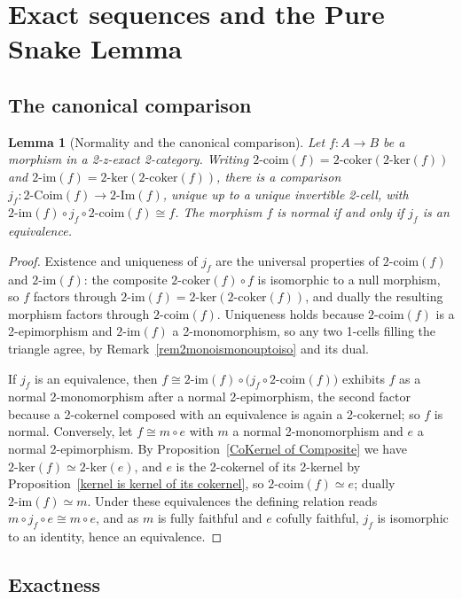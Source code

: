 \documentclass[reqno,a4paper]{amsart}
\numberwithin{equation}{section}
\theoremstyle{plain}
\newtheorem{lemma}[subsection]{Lemma}
\theoremstyle{definition}
\def\nameit#1{\textrm{#1}~}
\def\prox{\nameit{Proposition}}
\def\remx{\nameit{Remark}}
\def\dfn#1{{\itshape #1}}
\newcommand{\comp}{\circ}
\newcommand{\iso}{\cong}
\renewcommand{\1}{\onecat{1}}
\newcommand{\twoker}{\ensuremath{2\text{-}\mathrm{ker}}}
\newcommand{\twocoker}{\ensuremath{2\text{-}\mathrm{coker}}}
\newcommand{\TwoImg}{\ensuremath{2\text{-}\mathrm{Im}}}
\newcommand{\twoimg}{\ensuremath{2\text{-}\mathrm{im}}}
\newcommand{\TwoCoim}{\ensuremath{2\text{-}\mathrm{Coim}}}
\newcommand{\twocoim}{\ensuremath{2\text{-}\mathrm{coim}}}
\begin{document}
\section{Exact sequences and the Pure Snake Lemma}\label{S:Exact}

\subsection{The canonical comparison}\label{SS:Comparison}

\begin{lemma}[Normality and the canonical comparison]\label{Normal Iff Comparison Iso}
	Let \(f\colon A\to B\) be a morphism in a 2-z-exact 2-category. Writing \(\twocoim(f)=\twocoker(\twoker(f))\) and \(\twoimg(f)=\twoker(\twocoker(f))\), there is a \dfn{comparison} \(j_f\colon\TwoCoim(f)\to\TwoImg(f)\), unique up to a unique invertible 2-cell, with \(\twoimg(f)\comp j_f\comp\twocoim(f)\iso f\). The morphism \(f\) is normal if and only if \(j_f\) is an equivalence.
\end{lemma}
\begin{proof}
	Existence and uniqueness of \(j_f\) are the universal properties of \(\twocoim(f)\) and \(\twoimg(f)\): the composite \(\twocoker(f)\comp f\) is isomorphic to a null morphism, so \(f\) factors through \(\twoimg(f)=\twoker(\twocoker(f))\), and dually the resulting morphism factors through \(\twocoim(f)\). Uniqueness holds because \(\twocoim(f)\) is a 2-epimorphism and \(\twoimg(f)\) a 2-monomorphism, so any two 1-cells filling the triangle agree, by \remx\ref{rem2monoismonouptoiso} and its dual.

	If \(j_f\) is an equivalence, then \(f\iso\twoimg(f)\comp\bigl(j_f\comp\twocoim(f)\bigr)\) exhibits \(f\) as a normal 2-monomorphism after a normal 2-epimorphism, the second factor because a 2-cokernel composed with an equivalence is again a 2-cokernel; so \(f\) is normal. Conversely, let \(f\iso m\comp e\) with \(m\) a normal 2-monomorphism and \(e\) a normal 2-epimorphism. By \prox\ref{CoKernel of Composite} we have \(\twoker(f)\simeq\twoker(e)\), and \(e\) is the 2-cokernel of its 2-kernel by \prox\ref{kernel is kernel of its cokernel}, so \(\twocoim(f)\simeq e\); dually \(\twoimg(f)\simeq m\). Under these equivalences the defining relation reads \(m\comp j_f\comp e\iso m\comp e\), and as \(m\) is fully faithful and \(e\) cofully faithful, \(j_f\) is isomorphic to an identity, hence an equivalence.
\end{proof}

\subsection{Exactness}\label{SS:Exactness}
\end{document}
